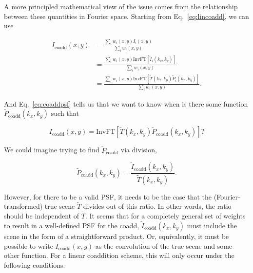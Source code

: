 \documentclass{openjournal}
\newcommand{\irresponse}[1]{{#1}}
\begin{document}
 
 A more principled mathematical view of the issue comes from the relationship between these quantities in Fourier space.  Starting from Eq.~\eqref{eq:lincoadd}, we can use
 \begin{linenomath}\begin{align*}
     I_\text{coadd}(x,y) &= \frac{\sum_i w_i(x,y) I_i(x,y)}{\sum_i w_i(x,y)} \\
     &= \frac{\sum_i w_i(x,y) \text{InvFT}[\widetilde{I}_i(k_x,k_y)]}{\sum_i w_i(x,y)}\\
     &= \frac{\sum_i w_i(x,y) \text{InvFT}[\widetilde{T}(k_x,k_y)\widetilde{P}_i(k_x,k_y)]}{\sum_i w_i(x,y)}.
 \end{align*}\end{linenomath}
And Eq.~\eqref{eq:coaddpsf} tells us that we want to know when is there some function $\widetilde{P}_\text{coadd}(k_x,k_y)$ such that
\begin{linenomath}\begin{equation*}
    I_\text{coadd}(x,y) = \text{InvFT}[\widetilde{T}(k_x,k_y)\widetilde{P}_\text{coadd}(k_x,k_y)]?
\end{equation*}\end{linenomath}
We could imagine trying to find $\widetilde{P}_\text{coadd}$ via division,
\begin{linenomath}\begin{equation}\label{eq:fourier_solve}
    \widetilde{P}_\text{coadd}(k_x,k_y) = \frac{\widetilde{I}_\text{coadd}(k_x,k_y)}{\widetilde{T}(k_x,k_y)}.
\end{equation}\end{linenomath}
However, for there to be a valid PSF, it needs to be the case that the \irresponse{(Fourier-transformed) true scene $\widetilde{T}$} divides out of this ratio. In other words, the ratio should be independent of $\widetilde{T}$.  It seems that for a completely general set of weights to result in a well-defined PSF for the coadd, $\widetilde{I}_\text{coadd}(k_x,k_y)$ must include the scene in the form of a straightforward product.  Or, equivalently, it must be possible to write $I_\text{coadd}(x,y)$ as the convolution of the true scene and some other function.   For a linear coaddition scheme, this will only occur under the following conditions:
\end{document}
